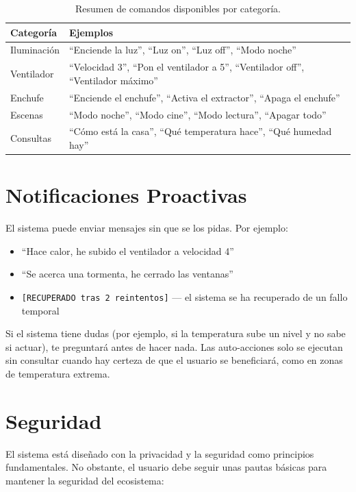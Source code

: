 \begin{table}[h]
\centering
\small
\begin{tabular}{|l|l|}
\hline
\textbf{Categoría} & \textbf{Ejemplos} \\
\hline
Iluminación & ``Enciende la luz'', ``Luz on'', ``Luz off'', ``Modo noche'' \\
Ventilador & ``Velocidad 3'', ``Pon el ventilador a 5'', ``Ventilador off'', ``Ventilador máximo'' \\
Enchufe & ``Enciende el enchufe'', ``Activa el extractor'', ``Apaga el enchufe'' \\
Escenas & ``Modo noche'', ``Modo cine'', ``Modo lectura'', ``Apagar todo'' \\
Consultas & ``Cómo está la casa'', ``Qué temperatura hace'', ``Qué humedad hay'' \\
\hline
\end{tabular}
\caption{Resumen de comandos disponibles por categoría.}
\label{tab:comandos_resumen}
\end{table}

\section{Notificaciones Proactivas}

El sistema puede enviar mensajes sin que se los pidas. Por ejemplo:

\begin{itemize}
    \item ``Hace calor, he subido el ventilador a velocidad 4''
    \item ``Se acerca una tormenta, he cerrado las ventanas''
    \item \texttt{[RECUPERADO tras 2 reintentos]} --- el sistema se ha recuperado de un fallo temporal
\end{itemize}

Si el sistema tiene dudas (por ejemplo, si la temperatura sube un nivel y no sabe si actuar), te preguntará antes de hacer nada. Las auto-acciones solo se ejecutan sin consultar cuando hay certeza de que el usuario se beneficiará, como en zonas de temperatura extrema.

\section{Seguridad}

El sistema está diseñado con la privacidad y la seguridad como principios fundamentales. No obstante, el usuario debe seguir unas pautas básicas para mantener la seguridad del ecosistema:

